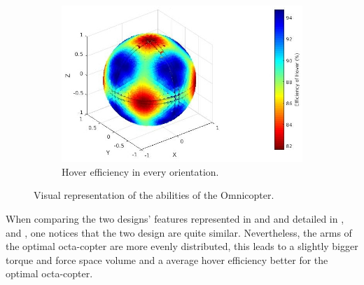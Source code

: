 \begin{figure}[!ht]
{  \begin{subfigure}[b]{0.45\textwidth}
    \includegraphics[width=\linewidth]{images/Omnicopter_hspace.jpg}
    \caption{Hover efficiency in every orientation.} \label{fig:Omnicopter_hspace}
  \end{subfigure}}
  \caption{Visual representation of the abilities of the Omnicopter.}
  \label{fig:Omnicopter_spaces}
\end{figure}

When comparing the two designs’ features represented in 
and  and detailed in ,
 and , one
notices that the two design are quite similar. Nevertheless, the arms of the optimal octa-copter
are more evenly distributed, this leads to a slightly bigger torque and force space volume
and a average hover efficiency better for the optimal octa-copter.

\begin{table}[!ht]
\begin{center}
 \caption{Information on the designs’ force space properties.}\vspace{1ex}
 \label{tab:tab_Octa_compare_force}
\end{center}
\end{table}

